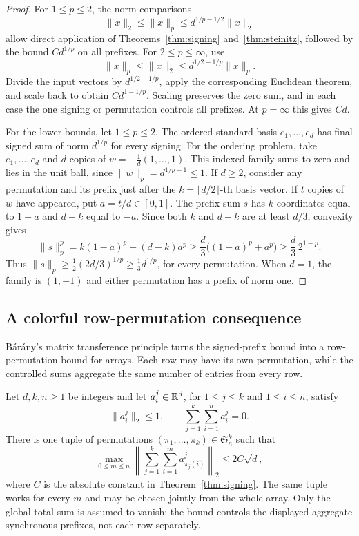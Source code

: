 \begin{proof}
For $1\le p\le2$, the norm comparisons
\[
 \lVert x\rVert_2\le\lVert x\rVert_p
 \le d^{1/p-1/2}\lVert x\rVert_2
\]
allow direct application of Theorems~\ref{thm:signing}
and~\ref{thm:steinitz}, followed by the bound $C d^{1/p}$ on all prefixes.
For $2\le p\le\infty$, use
\[
 \lVert x\rVert_p\le\lVert x\rVert_2
 \le d^{1/2-1/p}\lVert x\rVert_p.
\]
Divide the input vectors by $d^{1/2-1/p}$, apply the corresponding
Euclidean theorem, and scale back to obtain $C d^{1-1/p}$.
Scaling preserves the zero sum, and in each case the one signing or
permutation controls all prefixes. At $p=\infty$ this gives $Cd$.

For the lower bounds, let $1\le p\le2$. The ordered standard basis
$e_1,\ldots,e_d$ has final signed sum of norm $d^{1/p}$ for every signing.
For the ordering problem, take $e_1,\ldots,e_d$ and $d$ copies of
$w=-\tfrac1d(1,\ldots,1)$. This indexed family sums to zero and lies in
the unit ball, since $\lVert w\rVert_p=d^{1/p-1}\le1$.
If $d\ge2$, consider any permutation and its prefix just after the
$k=\lfloor d/2\rfloor$-th basis vector. If $t$ copies of $w$ have
appeared, put $a=t/d\in[0,1]$. The prefix sum $s$ has $k$ coordinates
equal to $1-a$ and $d-k$ equal to $-a$. Since both $k$ and $d-k$ are
at least $d/3$, convexity gives
\[
 \lVert s\rVert_p^p
 =k(1-a)^p+(d-k)a^p
 \ge\frac d3\bigl((1-a)^p+a^p\bigr)
 \ge\frac d3\,2^{1-p}.
\]
Thus $\lVert s\rVert_p\ge\tfrac12(2d/3)^{1/p}
\ge\tfrac13d^{1/p}$, for every permutation. When $d=1$, the family
is $(1,-1)$ and either permutation has a prefix of norm one.
\end{proof}

\subsection{A colorful row-permutation consequence}

B\'ar\'any's matrix transference principle turns the signed-prefix bound
into a row-permutation bound for arrays. Each row may have its own
permutation, while the controlled sums aggregate the same number of
entries from every row.

\begin{corollary}\label{cor:colorful-steinitz}
Let $d,k,n\ge1$ be integers and let $a_i^j\in\mathbb R^d$, for
$1\le j\le k$ and $1\le i\le n$, satisfy
\[
 \lVert a_i^j\rVert_2\le1,
 \qquad
 \sum_{j=1}^k\sum_{i=1}^n a_i^j=0.
\]
There is one tuple of permutations
$(\pi_1,\ldots,\pi_k)\in\mathfrak S_n^k$ such that
\[
 \max_{0\le m\le n}
 \left\lVert\sum_{j=1}^k\sum_{i=1}^m a_{\pi_j(i)}^j\right\rVert_2
 \le 2C\sqrt d,
\]
where $C$ is the absolute constant in Theorem~\ref{thm:signing}.
The same tuple works for every $m$ and may be chosen jointly from the
whole array. Only the global total sum is assumed to vanish; the bound
controls the displayed aggregate synchronous prefixes, not each row
separately.
\end{corollary}


